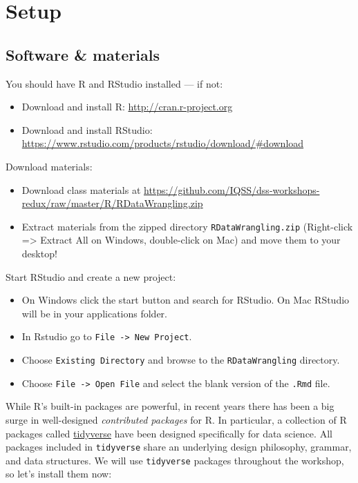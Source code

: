 \documentclass[]{book}
\providecommand{\tightlist}{%
  \setlength{\itemsep}{0pt}\setlength{\parskip}{0pt}}
\begin{document}
\section{Setup}\label{setup-3}

\subsection{Software \& materials}\label{software-materials-3}

You should have R and RStudio installed --- if not:

\begin{itemize}
\tightlist
\item
  Download and install R: \url{http://cran.r-project.org}
\item
  Download and install RStudio:
  \url{https://www.rstudio.com/products/rstudio/download/\#download}
\end{itemize}

Download materials:

\begin{itemize}
\tightlist
\item
  Download class materials at
  \url{https://github.com/IQSS/dss-workshops-redux/raw/master/R/RDataWrangling.zip}
\item
  Extract materials from the zipped directory
  \texttt{RDataWrangling.zip} (Right-click =\textgreater{} Extract All
  on Windows, double-click on Mac) and move them to your desktop!
\end{itemize}

Start RStudio and create a new project:

\begin{itemize}
\tightlist
\item
  On Windows click the start button and search for RStudio. On Mac
  RStudio will be in your applications folder.
\item
  In Rstudio go to \texttt{File\ -\textgreater{}\ New\ Project}.
\item
  Choose \texttt{Existing\ Directory} and browse to the
  \texttt{RDataWrangling} directory.
\item
  Choose \texttt{File\ -\textgreater{}\ Open\ File} and select the blank
  version of the \texttt{.Rmd} file.
\end{itemize}

While R's built-in packages are powerful, in recent years there has been
a big surge in well-designed \emph{contributed packages} for R. In
particular, a collection of R packages called
\href{https://www.tidyverse.org/}{tidyverse} have been designed
specifically for data science. All packages included in
\texttt{tidyverse} share an underlying design philosophy, grammar, and
data structures. We will use \texttt{tidyverse} packages throughout the
workshop, so let's install them now:
\end{document}
